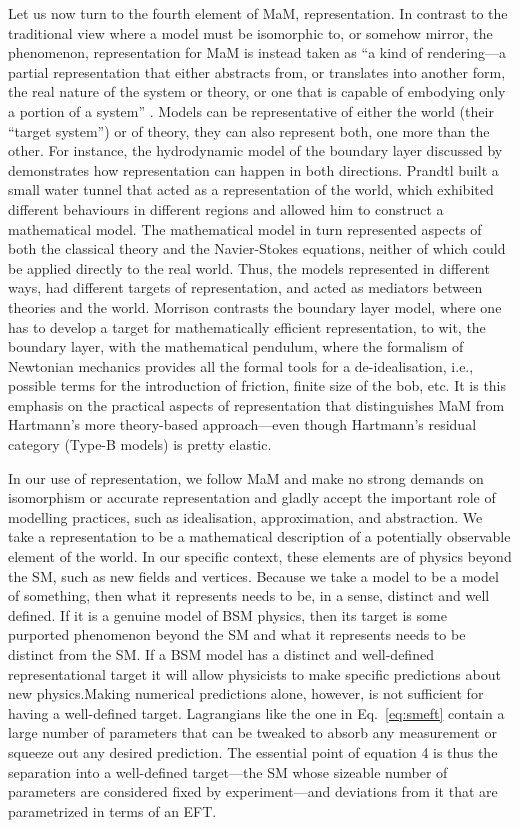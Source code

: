 Let us now turn to the fourth element of MaM, representation.
In contrast to the traditional view where a model must be isomorphic to, or somehow mirror, the phenomenon, representation for MaM is instead taken as ``a kind of rendering---a partial representation that either abstracts from, or translates into another form, the real nature of the system or theory, or one that is capable of embodying only a portion of a system'' \citep[p.~27]{morganmorrison}.
Models can be representative of either the world (their ``target system'') or of theory, they can also represent both, one more than the other. 
For instance, the hydrodynamic model of the boundary layer discussed by \citep{morrison99} demonstrates how representation can happen in both directions.
Prandtl built a small water tunnel that acted as a representation of the world, which exhibited different behaviours in different regions and allowed him to construct a mathematical model.
The mathematical model in turn represented aspects of both the classical theory and the Navier-Stokes equations, neither of which could be applied directly to the real world. 
Thus, the models represented in different ways, had different targets of representation, and acted as mediators between theories and the world. 
Morrison contrasts the boundary layer model, where one has to develop a target for mathematically efficient representation, to wit, the boundary layer, with the mathematical pendulum, where the formalism of Newtonian mechanics provides all the formal tools for a de-idealisation, i.e., possible terms for the introduction of friction, finite size of the bob, etc. 
It is this emphasis on the practical aspects of representation that distinguishes MaM from Hartmann's more theory-based approach---even though Hartmann's residual category (Type-B models) is pretty elastic.

In our use of representation, we follow MaM and make no strong demands on isomorphism or accurate representation and gladly accept the important role of modelling practices, such as idealisation, approximation, and abstraction. 
We take a representation to be a mathematical description of a potentially observable element of the world. 
In our specific context, these elements are of physics beyond the SM, such as new fields and vertices.
Because we take a model to be a model of something, then what it represents needs to be, in a sense, distinct and well defined. 
If it is a genuine model of BSM physics, then its target is some purported phenomenon beyond the SM and what it represents needs to be distinct from the SM. 
If a BSM model has a distinct and well-defined representational target it will allow physicists to make specific predictions about new physics.Making numerical predictions alone, however, is not sufficient for having a well-defined target. 
Lagrangians like the one in Eq.~\ref{eq:smeft} contain a large number of parameters that can be tweaked to absorb any measurement or squeeze out any desired prediction. 
The essential point of equation 4 is thus the separation into a well-defined target---the SM whose sizeable number of parameters are considered fixed by experiment---and deviations from it that are parametrized in terms of an EFT.

